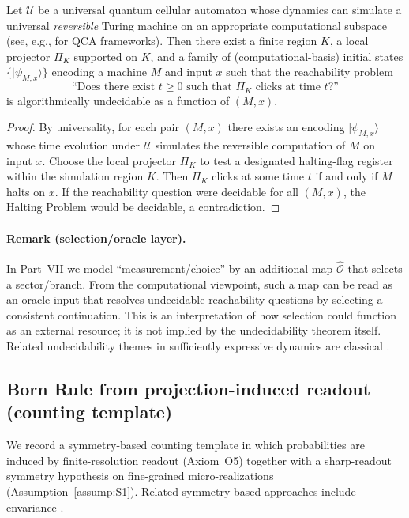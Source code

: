 \begin{theorem}
\label{thm:godel_measurement}
Let $\mathcal{U}$ be a universal quantum cellular automaton whose dynamics can simulate a universal \emph{reversible} Turing machine on an appropriate computational subspace (see, e.g., \cite{Watrous1995QCA,SchumacherWerner2004} for QCA frameworks). Then there exist a finite region $K$, a local projector $\Pi_K$ supported on $K$, and a family of (computational-basis) initial states $\{|\psi_{M,x}\rangle\}$ encoding a machine $M$ and input $x$ such that the reachability problem
\begin{equation}
    \text{``Does there exist }t\ge 0\text{ such that }\Pi_K\text{ clicks at time }t\text{?''}
\end{equation}
is algorithmically undecidable as a function of $(M,x)$.
\end{theorem}
\begin{proof}
By universality, for each pair $(M,x)$ there exists an encoding $|\psi_{M,x}\rangle$ whose time evolution under $\mathcal{U}$ simulates the reversible computation of $M$ on input $x$. Choose the local projector $\Pi_K$ to test a designated halting-flag register within the simulation region $K$. Then $\Pi_K$ clicks at some time $t$ if and only if $M$ halts on $x$. If the reachability question were decidable for all $(M,x)$, the Halting Problem would be decidable, a contradiction.
\end{proof}
\paragraph{Remark (selection/oracle layer).}
In Part~VII we model ``measurement/choice'' by an additional map $\hat{\mathcal{O}}$ that selects a sector/branch. From the computational viewpoint, such a map can be read as an oracle input that resolves undecidable reachability questions by selecting a consistent continuation. This is an interpretation of how selection could function as an external resource; it is not implied by the undecidability theorem itself. Related undecidability themes in sufficiently expressive dynamics are classical \cite{Moore1990Unpredictability,Kari1994Reversibility}.

\subsection{Born Rule from projection-induced readout (counting template)}
We record a symmetry-based counting template in which probabilities are induced by finite-resolution readout (Axiom~O5) together with a sharp-readout symmetry hypothesis on fine-grained micro-realizations (Assumption~\ref{assump:S1}). Related symmetry-based approaches include envariance \cite{Zurek2005}.

